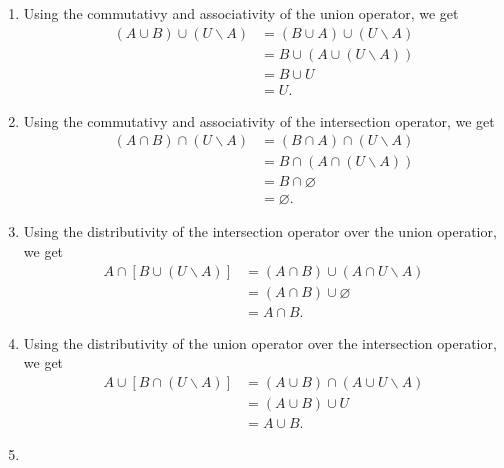\begin{enumerate}
      \begin{enumerate}
         \item Using the commutativy and associativity of the union operator, we
               get
               \begin{align*}
                  (A \cup B) \cup (U{\backslash}A)
                     &= (B \cup A) \cup (U{\backslash}A) \\
                     &= B \cup (A \cup (U{\backslash}A)) \\
                     &= B \cup U \\
                     &= U.
               \end{align*}
         \item Using the commutativy and associativity of the intersection
               operator, we get
               \begin{align*}
                  (A \cap B) \cap (U{\backslash}A)
                     &= (B \cap A) \cap (U{\backslash}A) \\
                     &= B \cap (A \cap (U{\backslash}A)) \\
                     &= B \cap \varnothing \\
                     &= \varnothing.
               \end{align*}
         \item Using the distributivity of the intersection operator over the
               union operatior, we get
               \begin{align*}
                  A \cap [B \cup (U{\backslash}A)]
                     &= (A \cap B) \cup (A \cap U{\backslash}A) \\
                     &= (A \cap B) \cup \varnothing \\
                     &= A \cap B.
               \end{align*}
         \item Using the distributivity of the union operator over the
               intersection operatior, we get
               \begin{align*}
                  A \cup [B \cap (U{\backslash}A)]
                     &= (A \cup B) \cap (A \cup U{\backslash}A) \\
                     &= (A \cup B) \cup U \\
                     &= A \cup B.
               \end{align*}
         \item \begin{align*}

\end{align*}
\end{enumerate}
\end{enumerate}
